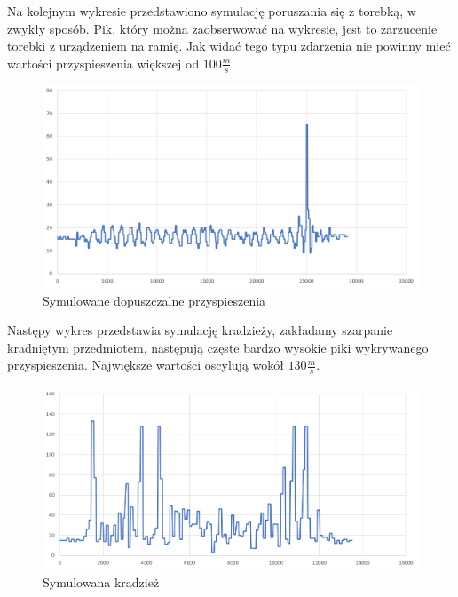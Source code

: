 \documentclass[10pt, a4paper]{article}
\begin{document}
Na kolejnym wykresie przedstawiono symulację poruszania się z torebką, w zwykły sposób. Pik, który można zaobserwować na wykresie, jest to zarzucenie torebki z urządzeniem na ramię. Jak widać tego typu zdarzenia nie powinny mieć wartości przyspieszenia większej od $100 \frac{m}{s}$. 
\begin{figure}[H]
\centering
\includegraphics[width=13cm]{figures/t2.png}
\caption{Symulowane dopuszczalne przyspieszenia}
\end{figure}
Następy wykres przedstawia symulację kradzieży, zakładamy szarpanie kradniętym przedmiotem, następują częste bardzo wysokie piki wykrywanego przyspieszenia. Największe wartości oscylują wokół $130\frac{m}{s}$.  \begin{figure}[H]
\centering
\includegraphics[width=13cm]{figures/t3.png}
\caption{Symulowana kradzież}
\end{figure}
\end{document}
